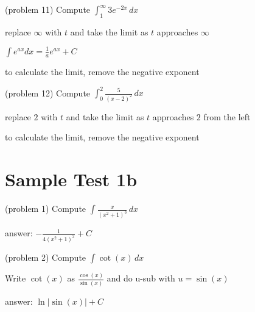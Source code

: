 \documentclass[handout]{ximera}
\begin{document}
\begin{problem}(problem 11)
Compute $\displaystyle \int_1^\infty 3e^{-2x} \, dx$

\begin{hint}
replace $\infty$ with $t$ and take the limit as $t$ approaches $\infty$
\end{hint}

\begin{hint}
$\displaystyle \int e^{ax} dx = \frac{1}{a} e^{ax} + C$
\end{hint}

\begin{hint}
to calculate the limit, remove the negative exponent
\end{hint}

\end{problem}


\begin{problem}(problem 12)
Compute $\displaystyle \int_{0}^2 \frac{5}{(x-2)^2} \, dx$

\begin{hint}
replace $2$ with $t$ and take the limit as $t$ approaches $2$ from the left
\end{hint}


\begin{hint}
to calculate the limit, remove the negative exponent
\end{hint}


\end{problem}




\section{Sample Test 1b}

\begin{problem}(problem 1)
Compute $\displaystyle \int \frac{x}{(x^2+1)^3} \, dx$

\begin{hint}
answer: $\displaystyle -\frac{1}{4(x^2+1)^2} + C$
\end{hint}

\end{problem}


\begin{problem}(problem 2)
Compute $\displaystyle \int \cot(x) \, dx$

\begin{hint}
Write $\cot(x)$ as $\frac{\cos(x)}{\sin(x)}$ and do u-sub with $u = \sin(x)$
\end{hint}

\begin{hint}
answer: $\ln|\sin(x)| + C$
\end{hint}

\end{problem}
\end{document}
